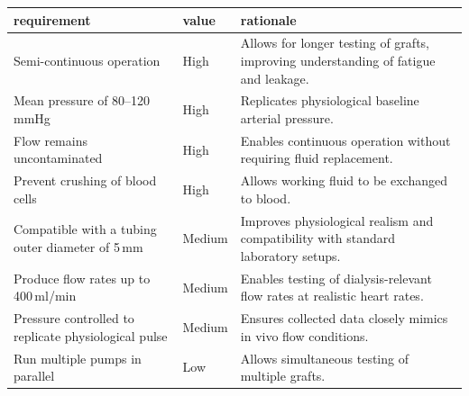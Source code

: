 \documentclass[10pt, a4paper]{article}
\begin{document}
\begin{table}[H]
    \small
    \centering
    \begin{tabularx}{\linewidth}{>{\raggedright\arraybackslash}p{4.5cm} p{2cm} X}
        \toprule
        \textbf{requirement} & \textbf{value}                                                                        & \textbf{rationale} \\
        \midrule

        Semi-continuous operation
                             & High
                             & Allows for longer testing of grafts, improving understanding of fatigue and leakage.                       \\

        Mean pressure of 80--120\,mmHg
                             & High
                             & Replicates physiological baseline arterial pressure.                                                       \\

        Flow remains uncontaminated
                             & High
                             & Enables continuous operation without requiring fluid replacement.                                          \\

        Prevent crushing of blood cells
                             & High
                             & Allows working fluid to be exchanged to blood.                                                             \\

        Compatible with a tubing outer diameter of 5\,mm
                             & Medium
                             & Improves physiological realism and compatibility with standard laboratory setups.                          \\

        Produce flow rates up to 400\,ml/min
                             & Medium
                             & Enables testing of dialysis-relevant flow rates at realistic heart rates.                                  \\

        Pressure controlled to replicate physiological pulse
                             & Medium
                             & Ensures collected data closely mimics in vivo flow conditions.                                             \\

        Run multiple pumps in parallel
                             & Low
                             & Allows simultaneous testing of multiple grafts.                                                            \\


\end{tabularx}
\end{table}
\end{document}
